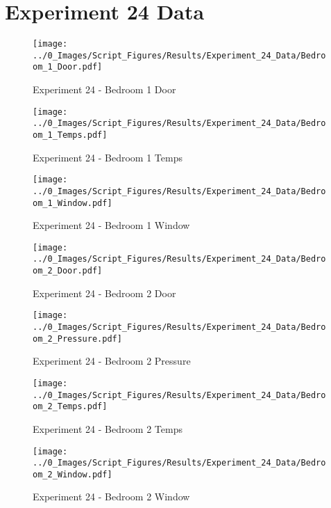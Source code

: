 	\clearpage

\clearpage		\large
\section{Experiment 24 Data} \label{App:Exp24Results} 

	\begin{figure}[H]
		\centering
		\texttt{[image: ../0\_Images/Script\_Figures/Results/Experiment\_24\_Data/Bedroom\_1\_Door.pdf]}
		\caption[]{Experiment 24 - Bedroom 1 Door}
	\end{figure}
 

	\begin{figure}[H]
		\centering
		\texttt{[image: ../0\_Images/Script\_Figures/Results/Experiment\_24\_Data/Bedroom\_1\_Temps.pdf]}
		\caption[]{Experiment 24 - Bedroom 1 Temps}
	\end{figure}
 
	\clearpage

	\begin{figure}[H]
		\centering
		\texttt{[image: ../0\_Images/Script\_Figures/Results/Experiment\_24\_Data/Bedroom\_1\_Window.pdf]}
		\caption[]{Experiment 24 - Bedroom 1 Window}
	\end{figure}
 

	\begin{figure}[H]
		\centering
		\texttt{[image: ../0\_Images/Script\_Figures/Results/Experiment\_24\_Data/Bedroom\_2\_Door.pdf]}
		\caption[]{Experiment 24 - Bedroom 2 Door}
	\end{figure}
 
	\clearpage

	\begin{figure}[H]
		\centering
		\texttt{[image: ../0\_Images/Script\_Figures/Results/Experiment\_24\_Data/Bedroom\_2\_Pressure.pdf]}
		\caption[]{Experiment 24 - Bedroom 2 Pressure}
	\end{figure}
 

	\begin{figure}[H]
		\centering
		\texttt{[image: ../0\_Images/Script\_Figures/Results/Experiment\_24\_Data/Bedroom\_2\_Temps.pdf]}
		\caption[]{Experiment 24 - Bedroom 2 Temps}
	\end{figure}
 
	\clearpage

	\begin{figure}[H]
		\centering
		\texttt{[image: ../0\_Images/Script\_Figures/Results/Experiment\_24\_Data/Bedroom\_2\_Window.pdf]}
		\caption[]{Experiment 24 - Bedroom 2 Window}
	\end{figure}
 

